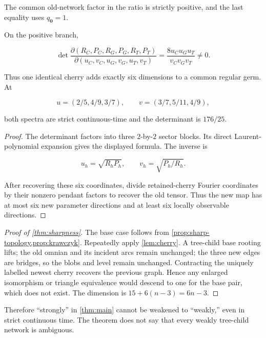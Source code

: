 The common old-network factor in the ratio is strictly positive, and the
last equality uses \(q_{\mathbf0}=1\).

\begin{lemma}\label{lem:cherry}
On the positive branch,

\[
 \det\frac{\partial(R_C,P_C,R_G,P_G,R_T,P_T)}
 {\partial(u_C,v_C,u_G,v_G,u_T,v_T)}
 =\frac{8u_Cu_Gu_T}{v_Cv_Gv_T}\ne0.
\]

Thus one identical cherry adds exactly six dimensions to a common regular
germ.  At

\[
 u=(2/5,4/9,3/7),\qquad v=(3/7,5/11,4/9),
\]

both spectra are strict continuous-time and the determinant is \(176/25\).
\end{lemma}

\begin{proof}
The determinant factors into three \(2\)-by-\(2\) sector blocks.  Its direct
Laurent-polynomial expansion gives the displayed formula.  The inverse is

\[
 u_h=\sqrt{R_hP_h},\qquad v_h=\sqrt{P_h/R_h}.
\]

After recovering these six coordinates, divide retained-cherry Fourier
coordinates by their nonzero pendant factors to recover the old tensor.
Thus the new map has at most six new parameter directions and at least six
locally observable directions.
\end{proof}

\begin{proof}[Proof of \cref{thm:sharpness}]
The base case follows from
\cref{prop:sharp-topology,prop:krawczyk}.  Repeatedly apply
\cref{lem:cherry}.  A tree-child base rooting lifts; the old omnian and its
incident arcs remain unchanged; the three new edges are bridges, so the blobs
and level remain unchanged.  Contracting the uniquely labelled newest cherry
recovers the previous graph.  Hence any enlarged isomorphism or triangle
equivalence would descend to one for the base pair, which does not exist.
The dimension is \(15+6(n-3)=6n-3\).
\end{proof}

Therefore ``strongly'' in \cref{thm:main} cannot be weakened to ``weakly,''
even in strict continuous time.  The theorem does not say that every weakly
tree-child network is ambiguous.
